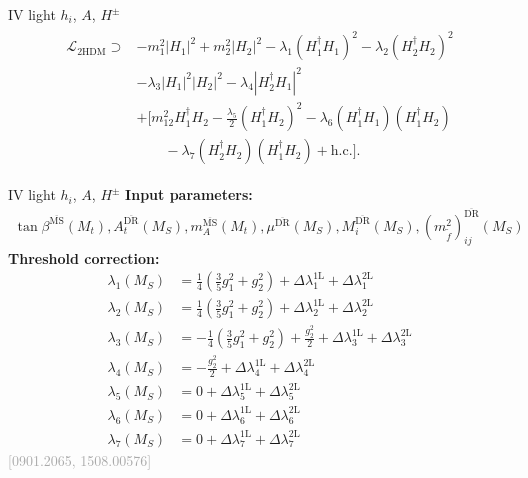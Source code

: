 \documentclass[hyperref={pdfpagelabels=false},ngerman]{beamer}
\newcommand{\MS}{\ensuremath{M_S}}
\newcommand{\bigcite}[1]{\textcolor{darkgray}{[#1]}}
\renewcommand{\emph}{\textbf}
\newcommand{\DRbar}{\ensuremath{\overline{\text{DR}}}}
\newcommand{\MSbar}{\ensuremath{\overline{\text{MS}}}}
\newcommand{\THDM}{\ensuremath{\text{2HDM}}\xspace}
\newcommand{\hc}{\ensuremath{\text{h.c.}}}
\newcommand{\Lag}{\ensuremath{\mathcal{L}}}
\newcommand{\DlTHDM}[2]{\Delta\lambda_{#1}^{\text{#2L}}}
\begin{document}
\begin{frame}{IV light $h_i$, $A$, $H^{\pm}$}
\begin{align*}
\begin{split}
  \Lag_\THDM \supset
  &-m_1^2 |H_1|^2 + m_2^2 |H_2|^2
  - \lambda_1 (H_1^\dagger H_1)^2
  - \lambda_2 (H_2^\dagger H_2)^2 \\
  &- \lambda_3 |H_1|^2 |H_2|^2
  - \lambda_4 |H_2^\dagger H_1|^2\\
  &+\Bigg[ m_{12}^2 H_1^\dagger H_2
  - \frac{\lambda_5}{2} (H_1^\dagger H_2)^2
  - \lambda_6 (H_1^\dagger H_1)(H_1^\dagger H_2)\\
  &\qquad- \lambda_7 (H_2^\dagger H_2)(H_1^\dagger H_2)
  + \hc \Bigg] .
\end{split}
\end{align*}
\end{frame}

\begin{frame}{IV light $h_i$, $A$, $H^{\pm}$}
  \emph{Input parameters:}
  \begin{align*}
  \tan\beta^{\MSbar}(M_t), A_t^{\DRbar}(\MS), m_A^{\MSbar}(M_t),
  \mu^{\DRbar}(\MS), M_i^{\DRbar}(\MS),
  (m_{\tilde{f}}^2)^{\DRbar}_{ij}(\MS)
  \end{align*}
  \emph{Threshold correction:}
  \begin{align*}
    \lambda_1(\MS) &= \frac{1}{4}\left(\frac{3}{5} g_1^2 + g_2^2\right) + \DlTHDM{1}{1} + \DlTHDM{1}{2}\\
    \lambda_2(\MS) &= \frac{1}{4}\left(\frac{3}{5} g_1^2 + g_2^2\right) + \DlTHDM{2}{1} + \DlTHDM{2}{2}\\
    \lambda_3(\MS) &= -\frac{1}{4} \left(\frac{3}{5}g_1^2 + g_2^2\right) + \frac{g_2^2}{2} + \DlTHDM{3}{1} + \DlTHDM{3}{2}\\
    \lambda_4(\MS) &= -\frac{g_2^2}{2} + \DlTHDM{4}{1} + \DlTHDM{4}{2}\\
    \lambda_5(\MS) &= 0 + \DlTHDM{5}{1} + \DlTHDM{5}{2}\\
    \lambda_6(\MS) &= 0 + \DlTHDM{6}{1} + \DlTHDM{6}{2}\\
    \lambda_7(\MS) &= 0 + \DlTHDM{7}{1} + \DlTHDM{7}{2}
  \end{align*}
  \hfill\bigcite{0901.2065, 1508.00576}
\end{frame}
\end{document}
